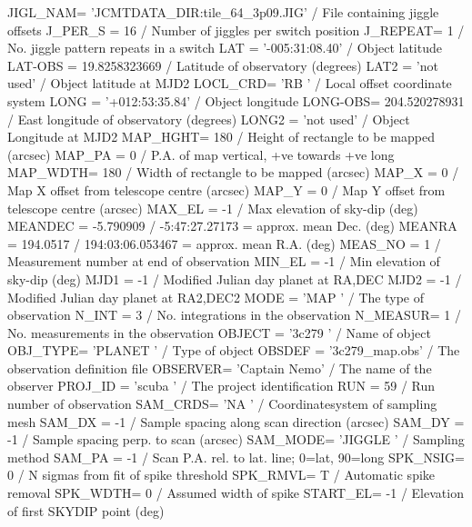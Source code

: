 \documentclass[twoside,11pt]{starlink}
\begin{document}
\begin{terminalv}
JIGL_NAM= 'JCMTDATA_DIR:tile_64_3p09.JIG' / File containing jiggle offsets
J_PER_S =                   16 / Number of jiggles per switch position
J_REPEAT=                    1 / No. jiggle pattern repeats in a switch
LAT     = '-005:31:08.40'      / Object latitude
LAT-OBS =        19.8258323669 / Latitude of observatory (degrees)
LAT2    = 'not used'           / Object latitude at MJD2
LOCL_CRD= 'RB      '           / Local offset coordinate system
LONG    = '+012:53:35.84'      / Object longitude
LONG-OBS=        204.520278931 / East longitude of observatory (degrees)
LONG2   = 'not used'           / Object Longitude at MJD2
MAP_HGHT=                  180 / Height of rectangle to be mapped (arcsec)
MAP_PA  =                    0 / P.A. of map vertical, +ve towards +ve long
MAP_WDTH=                  180 / Width of rectangle to be mapped (arcsec)
MAP_X   =                    0 / Map X offset from telescope centre (arcsec)
MAP_Y   =                    0 / Map Y offset from telescope centre (arcsec)
MAX_EL  =                   -1 / Max elevation of sky-dip (deg)
MEANDEC =            -5.790909 / -5:47:27.27173 = approx. mean Dec. (deg)
MEANRA  =             194.0517 / 194:03:06.053467 = approx. mean R.A. (deg)
MEAS_NO =                    1 / Measurement number at end of observation
MIN_EL  =                   -1 / Min elevation of sky-dip (deg)
MJD1    =                   -1 / Modified Julian day planet at RA,DEC
MJD2    =                   -1 / Modified Julian day planet at RA2,DEC2
MODE    = 'MAP     '           / The type of observation
N_INT   =                    3 / No. integrations in the observation
N_MEASUR=                    1 / No. measurements in the observation
OBJECT  = '3c279   '           / Name of object
OBJ_TYPE= 'PLANET  '           / Type of object
OBSDEF  = '3c279_map.obs'      / The observation definition file
OBSERVER= 'Captain Nemo'       / The name of the observer
PROJ_ID = 'scuba   '           / The project identification
RUN     =                   59 / Run number of observation
SAM_CRDS= 'NA      '           / Coordinatesystem of sampling mesh
SAM_DX  =                   -1 / Sample spacing along scan direction (arcsec)
SAM_DY  =                   -1 / Sample spacing perp. to scan (arcsec)
SAM_MODE= 'JIGGLE  '           / Sampling method
SAM_PA  =                   -1 / Scan P.A. rel. to lat. line; 0=lat, 90=long
SPK_NSIG=                    0 / N sigmas from fit of spike threshold
SPK_RMVL=                    T / Automatic spike removal
SPK_WDTH=                    0 / Assumed width of spike
START_EL=                   -1 / Elevation of first SKYDIP point (deg)

\end{terminalv}
\end{document}
